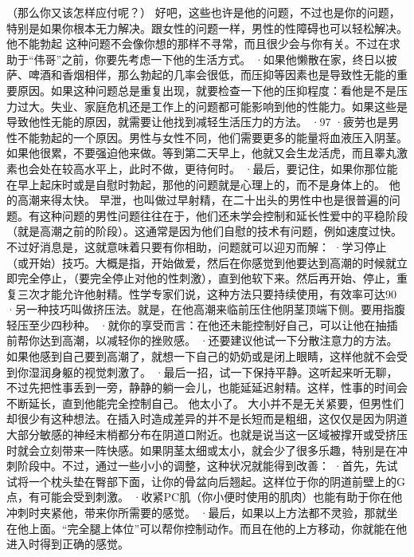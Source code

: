 \documentclass[12pt,UTF8]{ctexbook}
\begin{document}
（那么你又该怎样应付呢？）
好吧，这些也许是他的问题，不过也是你的问题，特别是如果你根本无力解决。跟女性的问题一样，男性的性障碍也可以轻松解决。
他不能勃起
这种问题不会像你想的那样不寻常，而且很少会与你有关。不过在求助于“伟哥”之前，你要先考虑一下他的生活方式。
·如果他懒散在家，终日以披萨、啤酒和香烟相伴，那么勃起的几率会很低，而压抑等因素也是导致性无能的重要原因。如果这种问题总是重复出现，就要检查一下他的压抑程度：看他是不是压力过大。失业、家庭危机还是工作上的问题都可能影响到他的性能力。如果这些是导致他性无能的原因，就需要让他找到减轻生活压力的方法。
·97%
·疲劳也是男性不能勃起的一个原因。男性与女性不同，他们需要更多的能量将血液压入阴茎。如果他很累，不要强迫他来做。等到第二天早上，他就又会生龙活虎，而且睾丸激素也会处在较高水平上，此时不做，更待何时。
·最后，要记住，如果你那位能在早上起床时或是自慰时勃起，那他的问题就是心理上的，而不是身体上的。
他的高潮来得太快。
早泄，也叫做过早射精，在二十出头的男性中也是很普遍的问题。有这种问题的男性问题往往在于，他们还未学会控制和延长性爱中的平稳阶段（就是高潮之前的阶段）。这通常是因为他们自慰的技术有问题，例如速度过快。不过好消息是，这就意味着只要有你相助，问题就可以迎刃而解：
·学习停止（或开始）技巧。大概是指，开始做爱，然后在你感觉到他要达到高潮的时候就立即完全停止，（要完全停止对他的性刺激），直到他软下来。然后再开始、停止，重复三次才能允许他射精。性学专家们说，这种方法只要持续使用，有效率可达90%
·另一种技巧叫做挤压法。就是，在他高潮来临前压住他阴茎顶端下侧。要用指腹轻压至少四秒种。
·就你的享受而言：在他还未能控制好自己，可以让他在抽插前帮你达到高潮，以减轻你的挫败感。
·还要建议他试一下分散注意力的方法。如果他感到自己要到高潮了，就想一下自己的奶奶或是闭上眼睛，这样他就不会受到你湿润身躯的视觉刺激了。
·最后一招，试一下保持平静。这听起来听无聊，不过先把性事丢到一旁，静静的躺一会儿，也能延延迟射精。这样，性事的时间会不断延长，直到他能完全控制自己。
他太小了。
大小并不是无关紧要，但男性们却很少有这种想法。在插入时造成差异的并不是长短而是粗细，这仅仅是因为阴道大部分敏感的神经末梢都分布在阴道口附近。也就是说当这一区域被撑开或受挤压时就会立刻带来一阵快感。如果阴茎太细或太小，就会少了很多乐趣，特别是在冲刺阶段中。不过，通过一些小小的调整，这种状况就能得到改善：
·首先，先试试将一个枕头垫在臀部下面，让你的骨盆向后翘起。这样位于你的阴道前壁上的G点，有可能会受到刺激。
·收紧PC肌（你小便时使用的肌肉）也能有助于你在他冲刺时夹紧他，带来你所需要的感觉。
·最后，如果以上方法都不灵验，那就坐在他上面。“完全腿上体位”可以帮你控制动作。而且在他的上方移动，你就能在他进入时得到正确的感觉。
\end{document}
